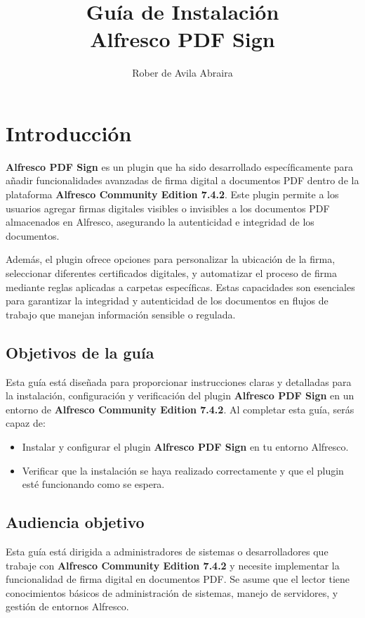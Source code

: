 \documentclass{template/ol-softwaremanual}
\title{Guía de Instalación \\ Alfresco PDF Sign}
\author{Rober de Avila Abraira}
\begin{document}
\maketitle

\tableofcontents
\newpage


\section{Introducción}

\textbf{Alfresco PDF Sign} es un plugin que ha sido desarrollado específicamente para añadir funcionalidades avanzadas de firma digital a documentos PDF dentro de la plataforma \textbf{Alfresco Community Edition 7.4.2}. Este plugin permite a los usuarios agregar firmas digitales visibles o invisibles a los documentos PDF almacenados en Alfresco, asegurando la autenticidad e integridad de los documentos.

Además, el plugin ofrece opciones para personalizar la ubicación de la firma, seleccionar diferentes certificados digitales, y automatizar el proceso de firma mediante reglas aplicadas a carpetas específicas. Estas capacidades son esenciales para garantizar la integridad y autenticidad de los documentos en flujos de trabajo que manejan información sensible o regulada.


\subsection{Objetivos de la guía}
Esta guía está diseñada para proporcionar instrucciones claras y detalladas para la instalación, configuración y verificación del plugin \textbf{Alfresco PDF Sign }en un entorno de \textbf{Alfresco Community Edition 7.4.2}. Al completar esta guía, serás capaz de:

\begin{itemize}
	\item Instalar y configurar el plugin \textbf{Alfresco PDF Sign} en tu entorno Alfresco.
	\item Verificar que la instalación se haya realizado correctamente y que el plugin esté funcionando como se espera.
\end{itemize}

\subsection{Audiencia objetivo}
Esta guía está dirigida a administradores de sistemas o desarrolladores que trabaje con \textbf{Alfresco Community Edition 7.4.2} y necesite implementar la funcionalidad de firma digital en documentos PDF. Se asume que el lector tiene conocimientos básicos de administración de sistemas, manejo de servidores, y gestión de entornos Alfresco.
\end{document}
